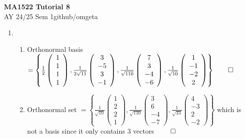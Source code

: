 \documentclass[12pt, a4paper]{article}
\newcommand{\mytitle}{MA1522 Tutorial 8}
\newcommand{\myauthor}{github/omgeta}
\newcommand{\mydate}{AY 24/25 Sem 1}
\begin{document}
\raggedright
\footnotesize
\begin{center}
{\normalsize{\textbf{\mytitle}}} \\
{\footnotesize{\mydate\hspace{2pt}\textemdash\hspace{2pt}\myauthor}}
\end{center}

\begin{enumerate}[Q\arabic*.]
  \item 
    \begin{enumerate}[(\alph*)]
      \item Orthonormal basis $ = \left\{ \frac{1}{2}\left(\begin{array}{c} 1\\ 1\\ 1\\ 1 \end{array}\right), \frac{1}{2\sqrt{11}}\left(\begin{array}{c} 3\\-5\\3\\-1 \end{array}\right), \frac{1}{\sqrt{110}}\left(\begin{array}{c} 7\\3\\-4\\-6 \end{array}\right), \frac{1}{\sqrt{10}}\left(\begin{array}{c} 1\\-1\\-2\\2 \end{array}\right) \right\} \qed$
      \item Orthonormal set $ = \left\{ \frac{1}{\sqrt{10}}\left(\begin{array}{c} 1\\ 2\\ 2\\ 1 \end{array}\right), \frac{1}{\sqrt{110}}\left(\begin{array}{c} 3\\6\\-4\\-7 \end{array}\right), \frac{1}{\sqrt{33}}\left(\begin{array}{c} 4\\-3\\2\\-2 \end{array}\right) \right\}$ which is not a basis since it only contains 3 vectors $\qed$
    \end{enumerate}


\end{enumerate}
\end{document}
